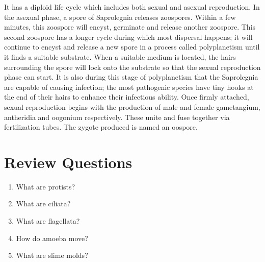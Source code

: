 It has a diploid life cycle which includes both sexual and asexual
reproduction. In the asexual phase, a spore of Saprolegnia releases
zoospores. Within a few minutes, this zoospore will encyst, germinate
and release another zoospore. This second zoospore has a longer cycle
during which most dispersal happens; it will continue to encyst and
release a new spore in a process called polyplanetism until it finds a
suitable substrate. When a suitable medium is located, the hairs
surrounding the spore will lock onto the substrate so that the sexual
reproduction phase can start. It is also during this stage of
polyplanetism that the Saprolegnia are capable of causing infection; the
most pathogenic species have tiny hooks at the end of their hairs to
enhance their infectious ability. Once firmly attached, sexual
reproduction begins with the production of male and female gametangium,
antheridia and oogonium respectively. These unite and fuse together via
fertilization tubes. The zygote produced is named an oospore.

\section{Review Questions}\label{review-questions-10}

\begin{enumerate}
\def\labelenumi{\arabic{enumi}.}
\tightlist
\item
  What are protists?
\item
  What are ciliata?
\item
  What are flagellata?
\item
  How do amoeba move?
\item
  What are slime molds?
\end{enumerate}
